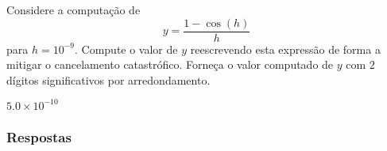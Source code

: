 \begin{exer}\label{exer:cancela_1}
  Considere a computação de
  \begin{equation}
    y = \frac{1 - \cos(h)}{h}
  \end{equation}
para $h=10^{-9}$. Compute o valor de $y$ reescrevendo esta expressão de forma a mitigar o cancelamento catastrófico. Forneça o valor computado de $y$ com $2$ dígitos significativos por arredondamento.
\end{exer}
\begin{resp}
  $5.0\times 10^{-10}$
\end{resp}

\ifisbook
\subsubsection{Respostas}
\shipoutAnswer
\fi

